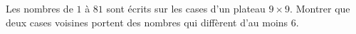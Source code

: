 Les nombres de $1$ à $81$ sont écrits sur les cases d'un plateau $9 \times 9$. Montrer que deux cases voisines portent des nombres qui diffèrent d'au moins $6$.

